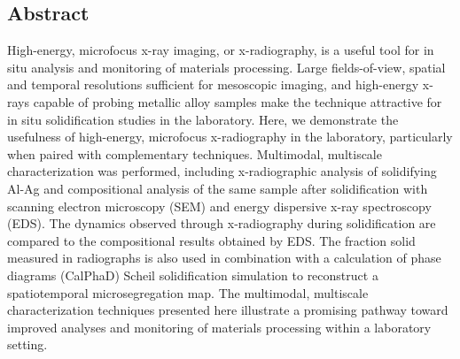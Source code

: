 \subsection{Abstract}
High-energy, microfocus x-ray imaging, or x-radiography, is a useful tool
for in situ analysis and monitoring of materials processing. Large
fields-of-view, spatial and temporal resolutions sufficient for mesoscopic
imaging, and high-energy x-rays capable of probing metallic alloy samples
make the technique attractive for in situ solidification studies in the
laboratory. Here, we demonstrate the usefulness of high-energy, microfocus
x-radiography in the laboratory, particularly when paired with
complementary techniques. Multimodal, multiscale characterization was
performed, including x-radiographic analysis of solidifying Al-Ag and
compositional analysis of the same sample after solidification with
scanning electron microscopy (SEM) and energy dispersive x-ray
spectroscopy (EDS). The dynamics observed through x-radiography during
solidification are compared to the compositional results obtained by EDS.
The fraction solid measured in radiographs is also used in combination
with a calculation of phase diagrams (CalPhaD) Scheil solidification
simulation to reconstruct a spatiotemporal microsegregation map. The
multimodal, multiscale characterization techniques presented here
illustrate a promising pathway toward improved analyses and monitoring of
materials processing within a laboratory setting.


